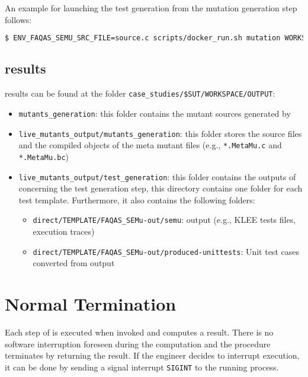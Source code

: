 An example for launching the test generation from the mutation generation step follows:

\begin{lstlisting}[language=bash]
 $ ENV_FAQAS_SEMU_SRC_FILE=source.c scripts/docker_run.sh mutation WORKSPACE/DOWNLOADED/live_mutants WORKSPACE/OUTPUT/live_mutants_output
\end{lstlisting}

\subsection{\SEMUS results}

\SEMUS results can be found at the folder \texttt{case\_studies/\$SUT/WORKSPACE/OUTPUT}:

\begin{itemize}
	\item \texttt{mutants\_generation}: this folder contains the mutant sources generated by \MASS
	\item \texttt{live\_mutants\_output/mutants\_generation}: this folder stores the source files and the compiled objects of the meta mutant files (e.g., \texttt{*.MetaMu.c} and \texttt{*.MetaMu.bc})
	\item \texttt{live\_mutants\_output/test\_generation}: this folder contains the outputs of \SEMUS concerning the test generation step, this directory contains one folder for each test template. Furthermore, it also contains the following folders:
	\begin{itemize}
		\item \texttt{direct/TEMPLATE/FAQAS\_SEMu-out/semu}: \SEMU output (e.g., KLEE tests files, execution traces)
		\item \texttt{direct/TEMPLATE/FAQAS\_SEMu-out/produced-unittests}: Unit test cases converted from \SEMU output
	\end{itemize}

\end{itemize}



\section{Normal Termination}


Each step of \SEMUS is executed when invoked and computes a result. There is no software interruption foreseen during the computation and the procedure terminates by returning the result.
If the engineer decides to interrupt \SEMUS execution, it can be done by sending a signal interrupt \texttt{SIGINT} to the running process.

